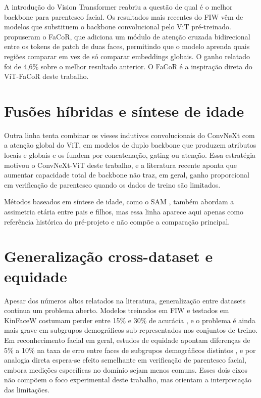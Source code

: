A introdução do Vision Transformer \cite{dosovitskiy2020image}
reabriu a questão de qual é o melhor backbone para parentesco facial. Os resultados mais recentes do FIW vêm de modelos que substituem o backbone convolucional pelo ViT pré-treinado. 
propuseram o FaCoR, que adiciona um módulo de atenção cruzada bidirecional entre os tokens de patch de duas faces, permitindo que o modelo aprenda quais regiões comparar em vez de só comparar embeddings globais. O ganho relatado foi de 4,6\% sobre o melhor resultado anterior. O FaCoR é a inspiração direta do ViT-FaCoR deste trabalho.

\section{Fusões híbridas e síntese de idade}

Outra linha tenta combinar os vieses indutivos convolucionais do ConvNeXt \cite{liu2022convnet}
com a atenção global do ViT, em modelos de duplo backbone que produzem atributos locais e globais e os fundem por concatenação, gating ou atenção. Essa estratégia motivou o ConvNeXt-ViT deste trabalho, e a literatura recente aponta que aumentar capacidade total de backbone não traz, em geral, ganho proporcional em verificação de parentesco quando os dados de treino são limitados.

Métodos baseados em síntese de idade, como o SAM \cite{alaluf2022sam}, também abordam a assimetria etária entre pais e filhos, mas essa linha aparece aqui apenas como referência histórica do pré-projeto e não compõe a comparação principal.

\section{Generalização cross-dataset e equidade}

Apesar dos números altos relatados na literatura, generalização entre datasets continua um problema aberto. Modelos treinados em FIW e testados em KinFaceW costumam perder entre 15\% e 30\% de acurácia \cite{robinson2022survey}, e o problema é ainda mais grave em subgrupos demográficos sub-representados nos conjuntos de treino. Em reconhecimento facial em geral, estudos de equidade apontam diferenças de 5\% a 10\% na taxa de erro entre faces de subgrupos demográficos distintos \cite{buolamwini2018gender}, e por analogia direta espera-se efeito semelhante em verificação de parentesco facial, embora medições específicas no domínio sejam menos comuns.
Esses dois eixos não compõem o foco experimental deste trabalho, mas orientam a interpretação das limitações.

